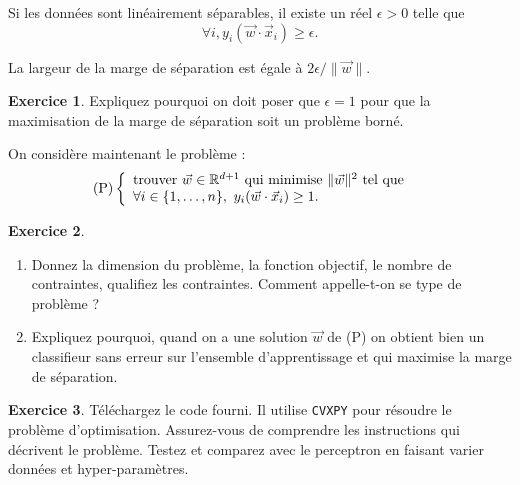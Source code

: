 \documentclass[a4paper,francais]{article}
\newcommand{\R}{{\ensuremath\mathbb{R}}}
\theoremstyle{definition}
\newtheorem{exercice}{Exercice}[section]
\begin{document}

Si les données sont linéairement séparables,
il existe un réel $\epsilon > 0$ telle que
\[  \forall i, y_i(\vec{w} \cdot \vec{x}_i) \geq \epsilon. \] 

La largeur de la marge de séparation est égale à $2 \epsilon / \|\vec{w}\|$.

\begin{exercice}
  Expliquez pourquoi on doit poser que $\epsilon = 1$ pour que la maximisation
  de la marge de séparation soit un problème borné. 
\end{exercice}

On considère maintenant le problème :
%
\[
\text{(P)}
\left\{
\begin{array}{ll}
  \text{trouver} \ \vec{w} \in \R^{d+1} \ \text{qui minimise} \ \|\vec{w}\|^2 \ \text{tel que} & \\
  \forall i \in \{1,\dots,n\}, \ y_i(\vec{w} \cdot \vec{x}_i) \geq 1. 
\end{array}
\right.
\]

\begin{exercice}
  ~
  
  \begin{enumerate}
  \item Donnez la dimension du problème, la fonction objectif,
    le nombre de contraintes, qualifiez les contraintes.
    Comment appelle-t-on se type de problème ?
  \item Expliquez pourquoi, quand on a une solution $\vec{w}$
    de (P) on obtient bien un classifieur sans erreur sur l'ensemble
    d'apprentissage et qui maximise la marge de séparation.   
  \end{enumerate}
\end{exercice}

\begin{exercice}
  Téléchargez le code fourni. Il utilise \verb!CVXPY! pour résoudre le problème
  d'optimisation. Assurez-vous de comprendre les instructions qui décrivent le problème.
  Testez et comparez avec le perceptron en faisant varier données et hyper-paramètres.  
\end{exercice}
\end{document}
